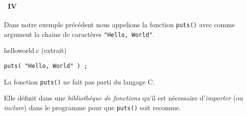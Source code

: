 \begin{frame}[containsverbatim]
  \frametitle{\secname}
  \framesubtitle{\subsecname~IV}

  Dans notre exemple précédent nous appelions la fonction \verb|puts()| avec comme argument la chaine de caractères \verb|"Hello, World"|.
  \begin{exampleblock}{helloworld.c (extrait)}
    \begin{verbatim}
puts( "Hello, World" ) ;
    \end{verbatim}
  \end{exampleblock}
    \vspace{0.5cm}
    \par
    La fonction \verb|puts()| ne fait pas parti du langage C. 
    \vspace{0.5cm}
    \par
    Elle définit dans une \emph{bibliothèque de fonctions} qu'il est nécessaire d'\emph{importer} (ou \emph{inclure}) dans le programme pour que \verb|puts()| soit reconnue.  
\end{frame}

